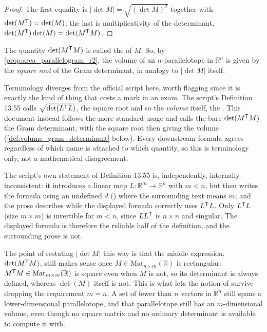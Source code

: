 \begin{proof}
The first equality is $|\det M| = \sqrt{(\det M)^2}$ together with $\det(M^{\mathsf{T}})=\det(M)$;
the last is multiplicativity of the determinant, $\det(M^{\mathsf{T}})\det(M)=\det(M^{\mathsf{T}} M)$.
\end{proof}

The quantity $\det(M^{\mathsf{T}} M)$ is called the 
 of $M$. So, by \cref{prop:area_parallelogram_r2}, the
volume of an $n$-parallelotope in $\mathbb{R}^n$ is given by the \emph{square root} of the Gram
determinant, in analogy to $\lvert\det M\rvert$ itself.

\begin{ainote}
Terminology diverges from the official script here, worth flagging since it is exactly the kind
of thing that costs a mark in an exam. The script's Definition 13.55 calls $\sqrt{\det(L^{\mathsf{T}}
L)}$, the square root and so the \emph{volume} itself, the . This
document instead follows the more standard usage and calls the bare $\det(M^{\mathsf{T}} M)$ the Gram
determinant, with the square root then giving the volume (\cref{def:volume_gram_determinant}
below). Every downstream formula agrees regardless of which name is attached to which quantity,
so this is terminology only, not a mathematical disagreement.

The script's own statement of Definition 13.55 is, independently, internally inconsistent: it
introduces a linear map $L:\mathbb{R}^m\to\mathbb{R}^n$ with $m<n$, but then writes the formula
using an undefined $d$ () where the surrounding text
means $m$; and the prose describes  while the
displayed formula correctly uses $L^{\mathsf{T}} L$. Only $L^{\mathsf{T}} L$ (size $m\times m$) is invertible
for $m<n$, since $LL^{\mathsf{T}}$ is $n\times n$ and singular. The displayed formula is therefore the
reliable half of the definition, and the surrounding prose is not.
\end{ainote}

\begin{ainote}
The point of restating $|\det M|$ this way is that the middle expression, $\det(M^{\mathsf{T}}
M)$, still makes sense once $M \in \mathrm{Mat}_{n\times m}(\mathbb{R})$ is rectangular:
$M^{\mathsf{T}} M \in \mathrm{Mat}_{m\times m}(\mathbb{R})$ is square even when $M$ is not, so its
determinant is always defined, whereas $\det(M)$ itself is not. This is what lets the
notion of  survive dropping the requirement $m=n$. A set of
fewer than $n$ vectors in $\mathbb{R}^n$ still spans a lower-dimensional parallelotope, and
that parallelotope still has an $m$-dimensional volume, even though no square matrix and no
ordinary determinant is available to compute it with.
\end{ainote}


